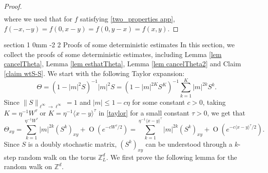 \documentclass{article}
\makeatletter
\newcommand{\1}{\mathds{1}}
\numberwithin{equation}{section}
\newcommand{\be}{\begin{equation}}
\newcommand{\ee}{\end{equation}}
\newcommand{\wt}{\widetilde}
\renewcommand{\leq}{\leqslant}
\renewcommand{\le}{\leq}
\newcommand{\Z}{\mathbb{Z}}
\DeclareMathOperator{\OO}{O}
\theoremstyle{plain} %
\theoremstyle{remark}
\renewcommand{\section}{\@startsection
{section}%
{1}%
{0mm}%
{-2\baselineskip}%
{2\baselineskip}%
{\normalfont\large\scshape\centering}} %
\makeatother
\begin{document}
\begin{proof}
\begin{align*}
\end{align*}
where we used that for $f$ satisfying \eqref{two_properties app}, $f(-x,-y)=f(0,x-y)=f(0,y-x)=f(x,y).$ %
\end{proof}





\section{Proofs of some deterministic estimates}\label{appd}
In this section, we collect the proofs of some deterministic estimates, including Lemma \ref{lem cancelTheta}, Lemma \ref{lem esthatTheta}, Lemma \ref{lem cancelTheta2} and Claim \ref{claim wtS-S}. We start with the following Taylor expansion:
\begin{equation}\label{taylor}
\Theta = (1-|m|^2 S)^{-1}|m|^2S =  \left( 1-|m|^{2K}S^{K}\right)^{-1}\sum_{k=1}^{K}|m|^{2k}S^{k}.
 \end{equation}
Since $\|S\|_{\ell^\infty \to \ell^\infty} = 1$ and $|m|\le 1 - c\eta$ for some constant $c>0$, 
taking $K=\eta^{-1} W^\tau$ or $K=\eta^{-1} \langle x-y \rangle^\tau$ in \eqref{taylor} for a small constant $\tau>0$, we get that
\be\label{taylor1}
\Theta_{xy} = \sum_{k=1}^{\eta^{-1} W^\tau} |m|^{2k}(S^{k})_{xy} +\OO(e^{-cW^\tau/2}) = \sum_{k=1}^{\eta^{-1} \langle x-y \rangle^\tau} |m|^{2k}(S^{k})_{xy} +\OO(e^{-c\langle x-y \rangle^\tau/2}).
\ee
Since $S$ is a doubly stochastic matrix, $(S^{k})_{xy}$ can be understood through a $k$-step random walk on the torus $\Z_L^d$. We first prove the following lemma for the random walk on $\Z^d$.
\end{document}
